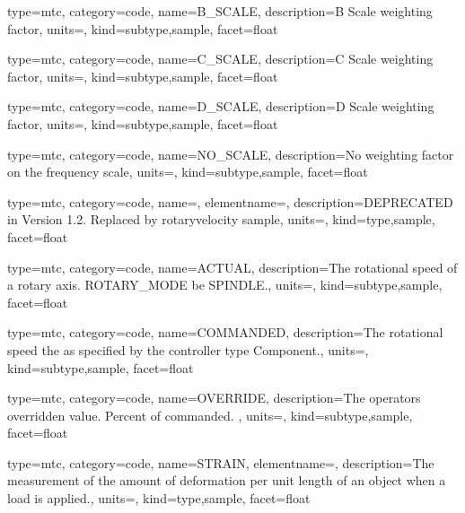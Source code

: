 {
  type=mtc,
  category=code,
  name={B\_SCALE},
  description={B Scale weighting factor},
  units=,
  kind={subtype,sample},
  facet={\gls{float}}
}


{
  type=mtc,
  category=code,
  name={C\_SCALE},
  description={C Scale weighting factor},
  units=,
  kind={subtype,sample},
  facet={\gls{float}}
}


{
  type=mtc,
  category=code,
  name={D\_SCALE},
  description={D Scale weighting factor},
  units=,
  kind={subtype,sample},
  facet={\gls{float}}
}


{
  type=mtc,
  category=code,
  name={NO\_SCALE},
  description={No weighting factor on the frequency scale},
  units=,
  kind={subtype,sample},
  facet={\gls{float}}
}


{
  type=mtc,
  category=code,
  name={},
  elementname=,
  description={DEPRECATED in Version 1.2.  Replaced by \gls{rotaryvelocity sample}},
  units={},
  kind={type,sample},
  facet={\gls{float}}
}


{
  type=mtc,
  category=code,
  name={ACTUAL},
  description={The rotational speed of a rotary axis.  ROTARY\_MODE \must be SPINDLE.},
  units=,
  kind={subtype,sample},
  facet={\gls{float}}
}


{
  type=mtc,
  category=code,
  name={COMMANDED},
  description={The rotational speed the as specified by the \gls{controller} type Component.},
  units=,
  kind={subtype,sample},
  facet={\gls{float}}
}


{
  type=mtc,
  category=code,
  name={OVERRIDE},
  description={The operators overridden value.  Percent of commanded. },
  units=,
  kind={subtype,sample},
  facet={\gls{float}}
}


{
  type=mtc,
  category=code,
  name={STRAIN},
  elementname=,
  description={The measurement of the amount of deformation per unit length of an object when a load is applied.},
  units=,
  kind={type,sample},
  facet={\gls{float}}
}


